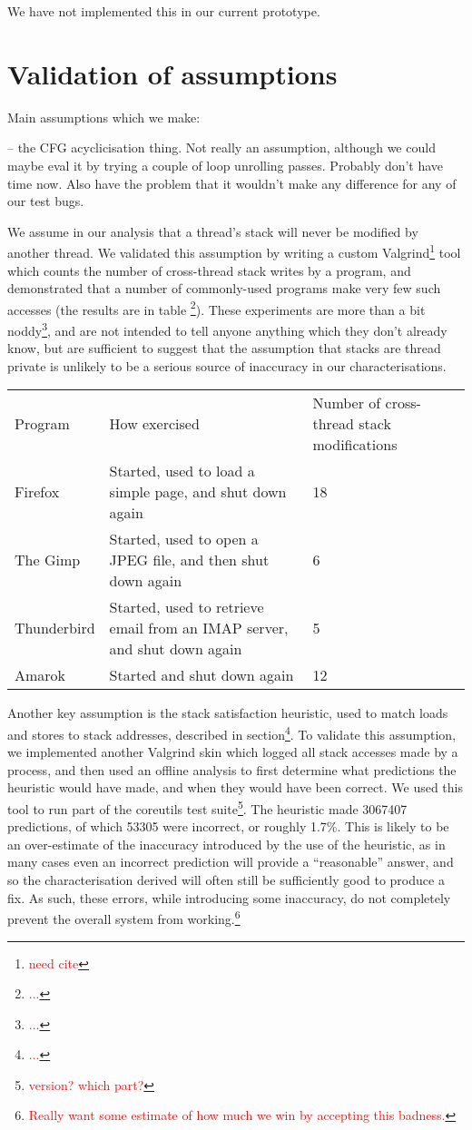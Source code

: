\documentclass[10pt,twocolumn,preprint,natbib,authoryear]{sigplanconf}
\newcommand{\editorial}[1]{\textcolor{red}{\footnote{\textcolor{red}{#1}}}}
\newcommand{\needCite}{\editorial{need cite}}
\begin{document}
We have not implemented this in our current prototype.

\section{Validation of assumptions}

Main assumptions which we make:

-- the CFG acyclicisation thing.  Not really an assumption, although
we could maybe eval it by trying a couple of loop unrolling passes.
Probably don't have time now.  Also have the problem that it wouldn't
make any difference for any of our test bugs.

We assume in our analysis that a thread's stack will never be modified
by another thread.  We validated this assumption by writing a custom
Valgrind\needCite{} tool which counts the number of cross-thread stack
writes by a program, and demonstrated that a number of commonly-used
programs make very few such accesses (the results are in table
\editorial{...}).  These experiments are more than a bit
noddy\editorial{...}, and are not intended to tell anyone anything
which they don't already know, but are sufficient to suggest that the
assumption that stacks are thread private is unlikely to be a serious
source of inaccuracy in our characterisations.

\begin{tabular}{lll}
Program & How exercised & Number of cross-thread stack modifications \\
Firefox & Started, used to load a simple page, and shut down again & 18 \\
The Gimp & Started, used to open a JPEG file, and then shut down again & 6 \\
Thunderbird & Started, used to retrieve email from an IMAP server, and shut down again & 5\\
Amarok & Started and shut down again & 12
\end{tabular}

Another key assumption is the stack satisfaction heuristic, used to
match loads and stores to stack addresses, described in
section\editorial{...}.  To validate this assumption, we implemented
another Valgrind skin which logged all stack accesses made by a
process, and then used an offline analysis to first determine what
predictions the heuristic would have made, and when they would have
been correct.  We used this tool to run part of the coreutils test
suite\editorial{version? which part?}.  The heuristic made 3067407
predictions, of which 53305 were incorrect, or roughly 1.7\%.  This is
likely to be an over-estimate of the inaccuracy introduced by the use
of the heuristic, as in many cases even an incorrect prediction will
provide a ``reasonable'' answer, and so the characterisation derived
will often still be sufficiently good to produce a fix.  As such,
these errors, while introducing some inaccuracy, do not completely
prevent the overall system from working.\editorial{Really want some
  estimate of how much we win by accepting this badness.}
\end{document}
